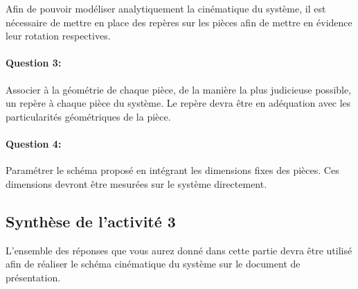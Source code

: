 Afin de pouvoir modéliser analytiquement la cinématique du système, il est nécessaire de mettre en place des repères sur les pièces afin de mettre en évidence leur rotation respectives.

\paragraph{Question 3:} Associer à la géométrie de chaque pièce, de la manière la plus judicieuse possible, un repère à chaque pièce du système. Le repère devra être en adéquation avec les particularités géométriques de la pièce.

\paragraph{Question 4:} Paramétrer le schéma proposé en intégrant les dimensions fixes des pièces. Ces dimensions devront être mesurées sur le système directement.

\reponse[4]

\subsection{Synthèse de l'activité 3}

L'ensemble des réponses que vous aurez donné dans cette partie devra être utilisé afin de réaliser le schéma cinématique du système sur le document de présentation.

